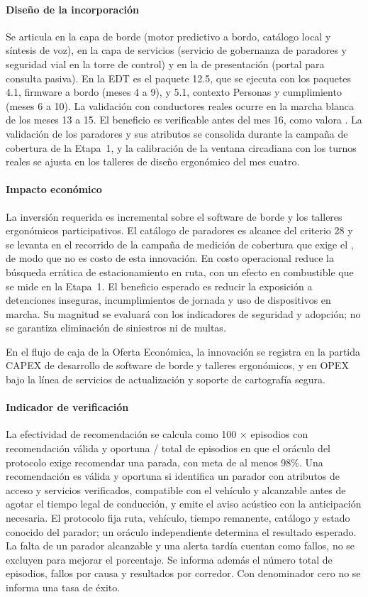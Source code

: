 \paragraph{Diseño de la incorporación} Se articula en la capa de borde (motor predictivo a bordo,
catálogo local y síntesis de voz), en la capa de servicios (servicio de gobernanza de paradores y
seguridad vial en la torre de control) y en la de presentación (portal para consulta pasiva). En la
EDT es el paquete 12.5, que se ejecuta con los paquetes 4.1, firmware a bordo (meses 4 a 9), y 5.1,
contexto Personas y cumplimiento (meses 6 a 10). La validación con conductores reales ocurre en la
marcha blanca de los meses 13 a 15. El beneficio es verificable antes
del mes 16, como valora . La validación de los paradores y sus atributos se
consolida durante la campaña de cobertura de la Etapa~1, y la calibración de la ventana circadiana con
los turnos reales se ajusta en los talleres de diseño ergonómico del mes cuatro.

\paragraph{Impacto económico} La inversión requerida es incremental sobre el software de borde y los
talleres ergonómicos participativos. El catálogo de paradores es alcance del criterio 28 y se levanta
en el recorrido de la campaña de medición de cobertura que exige el , de modo que
no es costo de esta innovación. En costo operacional
reduce la búsqueda errática de estacionamiento en ruta, con un efecto en combustible que se mide en la
Etapa~1. El beneficio esperado es reducir la exposición a detenciones inseguras, incumplimientos de jornada y uso de dispositivos en marcha. Su magnitud se evaluará con los indicadores de seguridad y adopción; no se garantiza eliminación de siniestros ni de multas.

En el flujo de caja de la Oferta Económica, la innovación se registra en la partida CAPEX de desarrollo de software de borde y talleres ergonómicos, y en OPEX bajo la línea de servicios de actualización y soporte de cartografía segura.

\paragraph{Indicador de verificación} La efectividad de recomendación se calcula como 100 × episodios con recomendación válida y oportuna / total de episodios en que el oráculo del protocolo exige recomendar una parada, con meta de al menos 98\%. Una recomendación es válida y oportuna si identifica un parador con atributos de acceso y servicios verificados, compatible con el vehículo y alcanzable antes de agotar el tiempo legal de conducción, y emite el aviso acústico con la anticipación necesaria. El protocolo fija ruta, vehículo, tiempo remanente, catálogo y estado conocido del parador; un oráculo independiente determina el resultado esperado. La falta de un parador alcanzable y una alerta tardía cuentan como fallos, no se excluyen para mejorar el porcentaje. Se informa además el número total de episodios, fallos por causa y resultados por corredor. Con denominador cero no se informa una tasa de éxito.

